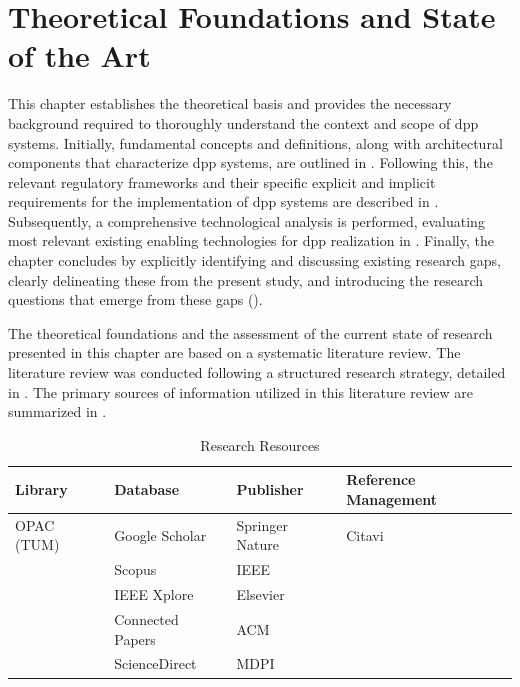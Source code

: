 \chapter{Theoretical Foundations and State of the Art}
\label{cha:chapter_2}
This chapter establishes the theoretical basis and provides the necessary background required to thoroughly understand the context and scope of \acrlong{dpp} systems. Initially, fundamental concepts and definitions, along with architectural components that characterize \ac{dpp} systems, are outlined in . Following this, the relevant regulatory frameworks and their specific explicit and implicit requirements for the implementation of \ac{dpp} systems are described in . Subsequently, a comprehensive technological analysis is performed, evaluating most relevant existing enabling technologies for \ac{dpp} realization in . Finally, the chapter concludes by explicitly identifying and discussing existing research gaps, clearly delineating these from the present study, and introducing the research questions that emerge from these gaps ().

The theoretical foundations and the assessment of the current state of research presented in this chapter are based on a systematic literature review. The literature review was conducted following a structured research strategy, detailed in . The primary sources of information utilized in this literature review are summarized in .

\begin{table}[htbp]
    \centering
    \caption{Research Resources}
    \begin{tabularx}{\textwidth}{|>{\centering\arraybackslash}X|>{\centering\arraybackslash}X|>{\centering\arraybackslash}X|>{\centering\arraybackslash}X|}
        \hline
        \rowcolor{myDarkBlue}\color{white}\textbf{Library} & \color{white}\textbf{Database} & \color{white}\textbf{Publisher} & \color{white}\textbf{Reference Management} \\
        \hline
        \rowcolor{lightgray!25}OPAC (TUM) & Google Scholar & Springer Nature & Citavi  \\
        \hline
        \rowcolor{myGrey} & Scopus & IEEE & \\
        \hline
        \rowcolor{lightgray!25} & IEEE Xplore & Elsevier & \\
        \hline
        \rowcolor{myGrey} & Connected Papers & ACM & \\
        \hline
        \rowcolor{lightgray!25} & ScienceDirect & MDPI & \\
        \hline
    \end{tabularx}
    \label{tab:research_resources}
\end{table}


